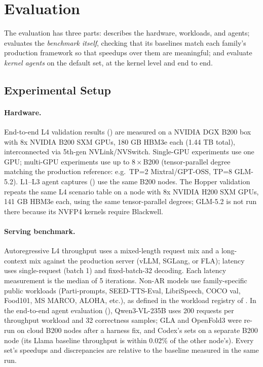 \section{Evaluation}
\label{fastkernels:sec:evaluation}

The evaluation has three parts:  describes the hardware, workloads, and agents;  evaluates the \emph{benchmark itself}, checking that its baselines match each family's production framework so that speedups over them are meaningful; and  evaluate \emph{kernel agents} on the default set, at the kernel level and end to end.

\subsection{Experimental Setup}
\label{fastkernels:sec:eval-setup}

\paragraph{Hardware.}
End-to-end L4 validation results () are measured on a NVIDIA DGX B200 box with 8x NVIDIA B200 SXM GPUs, 180 GB HBM3e each (1.44 TB total), interconnected via 5th-gen NVLink/NVSwitch.
Single-GPU experiments use one GPU; multi-GPU experiments use up to $8\times$B200 (tensor-parallel degree matching the production reference: e.g.\ TP=2 Mixtral/GPT-OSS, TP=8 GLM-5.2).
L1--L3 agent captures () use the same B200 nodes.
The Hopper validation repeats the same L4 scenario table on a node with 8x NVIDIA H200 SXM GPUs, 141 GB HBM3e each, using the same tensor-parallel degrees; GLM-5.2 is not run there because its NVFP4 kernels require Blackwell.

\paragraph{Serving benchmark.}
Autoregressive L4 throughput uses a mixed-length request mix and a long-context mix against the production server (vLLM, SGLang, or FLA); latency uses single-request (batch 1) and fixed-batch-32 decoding.
Each latency measurement is the median of 5 iterations.
Non-AR models use family-specific public workloads (Parti-prompts, SEED-TTS-Eval, LibriSpeech, COCO val, Food101, MS MARCO, ALOHA, etc.), as defined in the workload registry of .
In the end-to-end agent evaluation (), Qwen3-VL-235B uses 200 requests per throughput workload and 32 correctness samples; GLA and OpenFold3 were re-run on cloud B200 nodes after a harness fix, and Codex's sets on a separate B200 node (its Llama baseline throughput is within 0.02\% of the other node's).
Every set's speedups and discrepancies are relative to the baseline measured in the same run.

